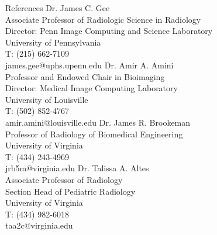 \documentclass{resume}
\begin{document}
\begin{category}{References}
\citemnobullet Dr. James C. Gee\\
Associate Professor of Radiologic Science in Radiology\\
Director: Penn Image Computing and Science Laboratory\\
University of Pennsylvania \\
T: (215) 662-7109 \\
james.gee@uphs.upenn.edu
\citemnobullet Dr. Amir A. Amini\\
Professor and Endowed Chair in Bioimaging \\
Director: Medical Image Computing Laboratory\\
University of Louisville \\
T:  (502) 852-4767\\
amir.amini@louisville.edu
\citemnobullet Dr. James R. Brookeman	\\
Professor of Radiology of Biomedical Engineering\\
University of Virginia \\
T:  (434) 243-4969\\
jrb5m@virginia.edu
\citemnobullet Dr. Talissa A. Altes\\
Associate Professor of Radiology \\
Section Head of Pediatric Radiology\\
University of Virginia \\
T:  (434) 982-6018\\
taa2c@virginia.edu

\end{category}
\end{document}
